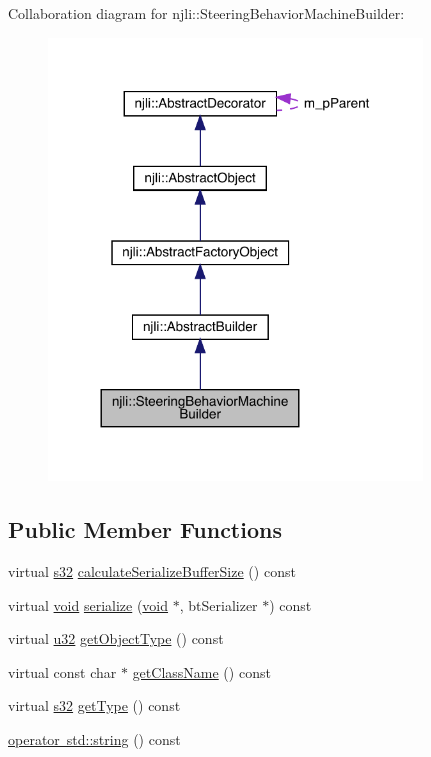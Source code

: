 Collaboration diagram for njli\+:\+:Steering\+Behavior\+Machine\+Builder\+:\nopagebreak
\begin{figure}[H]
\begin{center}
\leavevmode
\includegraphics[width=281pt]{classnjli_1_1_steering_behavior_machine_builder__coll__graph}
\end{center}
\end{figure}
\subsection*{Public Member Functions}
\begin{DoxyCompactItemize}
\item 
virtual \mbox{\hyperlink{_util_8h_aa62c75d314a0d1f37f79c4b73b2292e2}{s32}} \mbox{\hyperlink{classnjli_1_1_steering_behavior_machine_builder_a0e58242742971d09f8951c4b4337c7d4}{calculate\+Serialize\+Buffer\+Size}} () const
\item 
virtual \mbox{\hyperlink{_thread_8h_af1e856da2e658414cb2456cb6f7ebc66}{void}} \mbox{\hyperlink{classnjli_1_1_steering_behavior_machine_builder_aea21ad5a6fa0c1ed9decd6501e16751d}{serialize}} (\mbox{\hyperlink{_thread_8h_af1e856da2e658414cb2456cb6f7ebc66}{void}} $\ast$, bt\+Serializer $\ast$) const
\item 
virtual \mbox{\hyperlink{_util_8h_a10e94b422ef0c20dcdec20d31a1f5049}{u32}} \mbox{\hyperlink{classnjli_1_1_steering_behavior_machine_builder_a9a321d9d64bc49d4a63322819773c9bc}{get\+Object\+Type}} () const
\item 
virtual const char $\ast$ \mbox{\hyperlink{classnjli_1_1_steering_behavior_machine_builder_afd597391c6cf466f377abb59d8166155}{get\+Class\+Name}} () const
\item 
virtual \mbox{\hyperlink{_util_8h_aa62c75d314a0d1f37f79c4b73b2292e2}{s32}} \mbox{\hyperlink{classnjli_1_1_steering_behavior_machine_builder_a0cd739ed2ab0de74addadc632a0184fe}{get\+Type}} () const
\item 
\mbox{\hyperlink{classnjli_1_1_steering_behavior_machine_builder_a12c5a54271fd9f10010908a59fced890}{operator std\+::string}} () const
\end{DoxyCompactItemize}
